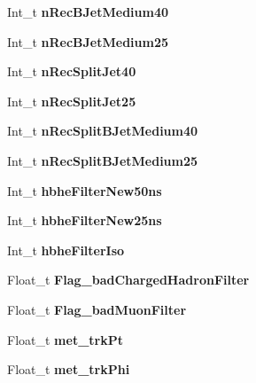 \begin{DoxyCompactItemize}
Int\+\_\+t {\bfseries n\+Rec\+B\+Jet\+Medium40}
\item 
\hypertarget{classMiniTree_acfbf4338208dd2ba248893bdfe80d592}{}\label{classMiniTree_acfbf4338208dd2ba248893bdfe80d592} 
Int\+\_\+t {\bfseries n\+Rec\+B\+Jet\+Medium25}
\item 
\hypertarget{classMiniTree_af9519e057aa451682df7bd5a1f6f9d3d}{}\label{classMiniTree_af9519e057aa451682df7bd5a1f6f9d3d} 
Int\+\_\+t {\bfseries n\+Rec\+Split\+Jet40}
\item 
\hypertarget{classMiniTree_a88168aca23365574dafbab69a19e2c37}{}\label{classMiniTree_a88168aca23365574dafbab69a19e2c37} 
Int\+\_\+t {\bfseries n\+Rec\+Split\+Jet25}
\item 
\hypertarget{classMiniTree_a813e74300dc626510e79952e264dec47}{}\label{classMiniTree_a813e74300dc626510e79952e264dec47} 
Int\+\_\+t {\bfseries n\+Rec\+Split\+B\+Jet\+Medium40}
\item 
\hypertarget{classMiniTree_abc775e4196654cd750d9f9ae917ae84c}{}\label{classMiniTree_abc775e4196654cd750d9f9ae917ae84c} 
Int\+\_\+t {\bfseries n\+Rec\+Split\+B\+Jet\+Medium25}
\item 
\hypertarget{classMiniTree_af5040623f17ebefd250b42884652484b}{}\label{classMiniTree_af5040623f17ebefd250b42884652484b} 
Int\+\_\+t {\bfseries hbhe\+Filter\+New50ns}
\item 
\hypertarget{classMiniTree_a251d462c153438a5560f2273a971ff66}{}\label{classMiniTree_a251d462c153438a5560f2273a971ff66} 
Int\+\_\+t {\bfseries hbhe\+Filter\+New25ns}
\item 
\hypertarget{classMiniTree_a2abbf347e8488f92733615ff755a84be}{}\label{classMiniTree_a2abbf347e8488f92733615ff755a84be} 
Int\+\_\+t {\bfseries hbhe\+Filter\+Iso}
\item 
\hypertarget{classMiniTree_a94a0768888695598e254d3e4e7be3c9f}{}\label{classMiniTree_a94a0768888695598e254d3e4e7be3c9f} 
Float\+\_\+t {\bfseries Flag\+\_\+bad\+Charged\+Hadron\+Filter}
\item 
\hypertarget{classMiniTree_aa788d1b7074f01847ba87b2fc22f9451}{}\label{classMiniTree_aa788d1b7074f01847ba87b2fc22f9451} 
Float\+\_\+t {\bfseries Flag\+\_\+bad\+Muon\+Filter}
\item 
\hypertarget{classMiniTree_aff643d0d72bc8c7c554500a018d69bce}{}\label{classMiniTree_aff643d0d72bc8c7c554500a018d69bce} 
Float\+\_\+t {\bfseries met\+\_\+trk\+Pt}
\item 
\hypertarget{classMiniTree_aa4289a406862de4a9f67c9d1a5e52db8}{}\label{classMiniTree_aa4289a406862de4a9f67c9d1a5e52db8} 
Float\+\_\+t {\bfseries met\+\_\+trk\+Phi}

\end{DoxyCompactItemize}
